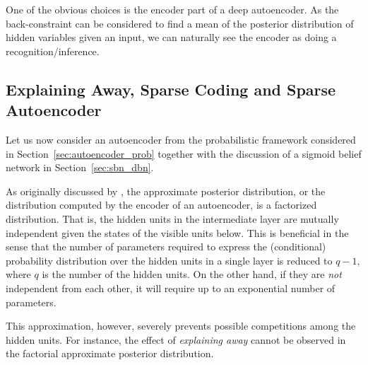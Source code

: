 \documentclass[dissertation,nocontribution,draft*]{aaltoseries}
\begin{document}
One of the obvious choices is the encoder part of a deep
autoencoder. As the back-constraint can be considered to
find a mean of the posterior distribution of hidden
variables given an input, we can naturally see the encoder
as doing a recognition/inference.


\subsection{Explaining Away, Sparse Coding and Sparse
Autoencoder}
\label{sec:explain_away}

Let us now consider an autoencoder from the probabilistic
framework considered in Section~\ref{sec:autoencoder_prob}
together with the discussion of a sigmoid belief network in
Section~\ref{sec:sbn_dbn}. 

As originally discussed by \citet{Hinton1995}, the
approximate posterior distribution, or the distribution
computed by the encoder of an autoencoder, is a factorized
distribution. That is, the hidden units in the intermediate
layer are mutually independent given the states of the
visible units below. This is beneficial in the sense that the
number of parameters required to express the (conditional)
probability distribution over the hidden units in a single
layer is reduced to $q-1$, where $q$ is the number of the
hidden units. On the other hand, if they are \textit{not}
independent from each other, it will require up to an exponential
number of parameters.

This approximation, however, severely prevents possible
competitions among the hidden units. For instance, the
effect of \textit{explaining away} \citep[see,
e.g.,][]{Wellman1993} cannot be observed in the factorial
approximate posterior distribution. 

\end{document}
